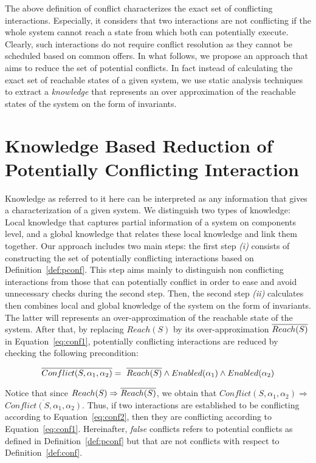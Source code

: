 The above definition of conflict characterizes the exact set of conflicting interactions.
Especially, it considers that two interactions are not conflicting if the whole system
cannot reach a state from which both can potentially execute.
Clearly, such interactions do not require conflict resolution as they cannot be scheduled
based on common offers.
In what follows, we propose an approach that aims to reduce the set of potential conflicts.
In fact instead of calculating the exact set of reachable states of a given system,
we use static analysis techniques to extract a \emph{knowledge} that represents an
over approximation of the reachable states of the system on the form of invariants.

\section{Knowledge Based Reduction of Potentially Conflicting Interaction}

Knowledge as referred to it here can be interpreted as any information that gives 
a characterization of a given system. We distinguish two types of knowledge:
Local knowledge that captures partial information of a system on components level, and
a global knowledge that relates these local knowledge and link them together.
Our approach includes two main steps: the first step \emph{(i)} consists of constructing the set
of potentially conflicting interactions based on Definition~\ref{def:pconf}. 
This step aims mainly to distinguish non conflicting interactions from those that can
potentially conflict in order to ease and avoid unnecessary checks during the second step.
Then, the second step \emph{(ii)} calculates then combines local and global knowledge 
of the system on the form of invariants. The latter will represents an over-approximation 
of the reachable state of the system. 
After that, by replacing $Reach(S)$ by its over-approximation $\overline{Reach(S)}$ in
Equation~\ref{eq:conf1}, potentially conflicting interactions are reduced by
checking the following precondition:

\begin{equation}\label{eq:conf2}
  \overline{Conflict(S,\alpha_1,\alpha_2)}=\ \overline{Reach(S)} \wedge Enabled(\alpha_1) \wedge 
  Enabled(\alpha_2)
\end{equation}

Notice that since $Reach(S)\Rightarrow\overline{Reach(S)}$, we obtain that 
$Conflict(S,\alpha_1,\alpha_2) \Rightarrow$\\$\overline{Conflict(S,\alpha_1,\alpha_2)}$.
Thus, if two interactions are established to be conflicting  
according to Equation~\ref{eq:conf2}, then they are conflicting according to 
Equation~\ref{eq:conf1}.
Hereinafter, \emph{false} conflicts refers to potential conflicts as defined in
Definition~\ref{def:pconf} but that are not conflicts with respect to Definition~\ref{def:conf}.

